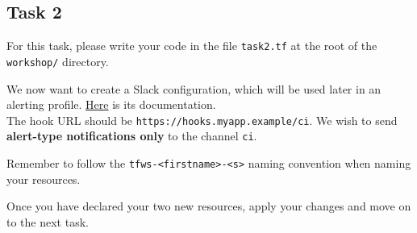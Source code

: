\subsection{Task 2}\label{sec:task2}

\begin{note}
For this task, please write your code in the file \texttt{task2.tf}
at the root of the \texttt{workshop/} directory.
\end{note}

We now want to create a Slack configuration, which will be used later
in an alerting profile. \href{https://intuinewin.github.io/taikun-docs/resources/slack_configuration.html}{Here} is its documentation.\\

The hook URL should be \texttt{https://hooks.myapp.example/ci}.
We wish to send \textbf{alert-type notifications only} to the channel \texttt{ci}.


\begin{warn}
  Remember to follow the \texttt{tfws-<firstname>-<s>} naming convention when naming your resources.
\end{warn}

Once you have declared your two new resources, apply your changes and move on to the next task.
